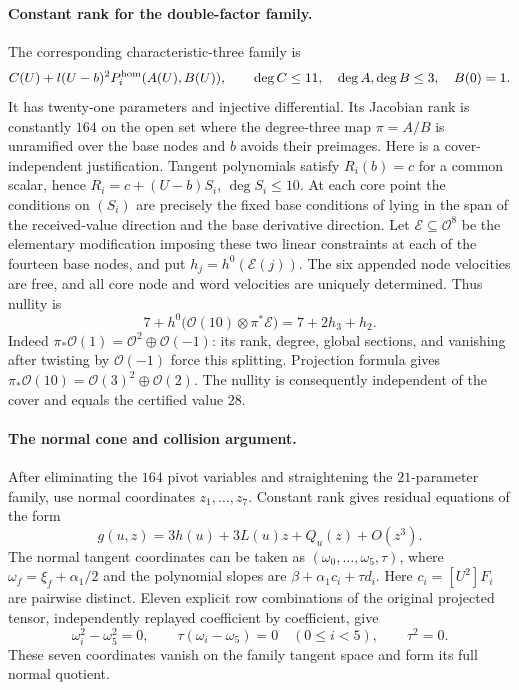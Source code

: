 \paragraph{Constant rank for the double-factor family.}
The corresponding characteristic-three family is
\[
 C(U)+l(U-b)^2P_i^{\rm hom}(A(U),B(U)),\qquad
 \deg C\le11,\quad \deg A,\deg B\le3,\quad B(0)=1.
\]
It has twenty-one parameters and injective differential. Its Jacobian
rank is constantly $164$ on the open set where the degree-three map
$\pi=A/B$ is unramified over the base nodes and $b$ avoids their preimages.
Here is a cover-independent justification. Tangent polynomials satisfy
$R_i(b)=c$ for a common scalar, hence
$R_i=c+(U-b)S_i$, $\deg S_i\le10$. At each core point the conditions on
$(S_i)$ are precisely the fixed base conditions of lying in the span of
the received-value direction and the base derivative direction. Let
$\mathcal E\subseteq\mathcal O^8$ be the elementary modification imposing
these two linear constraints at each of the fourteen base nodes, and put
$h_j=h^0(\mathcal E(j))$. The six appended node velocities are free, and
all core node and word velocities are uniquely determined. Thus nullity is
\[
 7+h^0\bigl(\mathcal O(10)\otimes\pi^*\mathcal E\bigr)
 =7+2h_3+h_2.
\]
Indeed $\pi_*\mathcal O(1)=\mathcal O^2\oplus\mathcal O(-1)$:
its rank, degree, global sections, and vanishing after twisting by
$\mathcal O(-1)$ force this splitting. Projection formula gives
$\pi_*\mathcal O(10)=\mathcal O(3)^2\oplus\mathcal O(2)$.
The nullity is consequently independent of the cover and equals the
certified value $28$.

\paragraph{The normal cone and collision argument.}
After eliminating the $164$ pivot variables and straightening the
$21$-parameter family, use normal coordinates $z_1,\ldots,z_7$.
Constant rank gives residual equations of the form
\[
 g(u,z)=3h(u)+3L(u)z+Q_u(z)+O(z^3).
\]
The normal tangent coordinates can be taken as
$(\omega_0,\ldots,\omega_5,\tau)$, where
$\omega_f=\xi_f+\alpha_1/2$ and the polynomial slopes are
$\beta+\alpha_1c_i+\tau d_i$. Here $c_i=[U^2]F_i$ are pairwise distinct.
Eleven explicit row combinations of the original projected tensor,
independently replayed coefficient by coefficient, give
\[
 \omega_i^2-\omega_5^2=0,\qquad
 \tau(\omega_i-\omega_5)=0\quad(0\le i<5),\qquad \tau^2=0.
\]
These seven coordinates vanish on the family tangent space and form its
full normal quotient.

